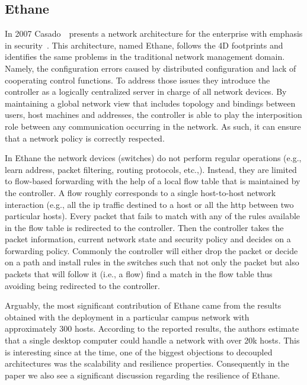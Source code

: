 \subsection{Ethane}
In 2007  Casado~\etal\ presents a network architecture for the enterprise with emphasis in security~\cite{Casado:2007kb}. 
This architecture, named Ethane, follows the 4D footprints and identifies the same problems in the traditional network management domain. Namely, the configuration errors caused by distributed configuration and lack of cooperating control functions. 
To address those issues they introduce the controller as a logically centralized server in charge of all network devices.
By maintaining a global network view that includes topology and  bindings between users, host machines and addresses, the controller is able to play the interposition role between any communication occurring in the network. As such, it can ensure that a network policy is correctly respected. 


In Ethane the network devices (switches) do not perform regular operations (e.g., learn address, packet filtering, routing protocols, etc.,).
Instead, they are limited  to flow-based forwarding with the help of a local flow table that is maintained by the controller. A flow roughly corresponds to a single host-to-host network interaction (e.g., all the \gls{ip} traffic destined to a host or  all the \gls{http} between two particular hosts). 
Every packet that fails to match with any of the rules available in the flow table is redirected to the controller. Then the controller takes the packet information, current network state and security policy and decides on a forwarding policy. Commonly the controller will either drop the packet or decide on a path and install rules in the switches such that  not only the packet but also packets that will follow it (i.e., a flow) find a match in the flow table thus avoiding being redirected to the controller. 


Arguably, the most significant contribution of Ethane came from the results obtained with the deployment in a particular campus network with approximately 300 hosts. 
According to the reported results, the authors estimate that a single desktop computer could handle a network with over 20k hosts.  
This is interesting since at the time,  one of the biggest objections to decoupled architectures was the scalability and resilience properties. 
Consequently  in the paper we also see a significant discussion regarding the resilience of Ethane. 

